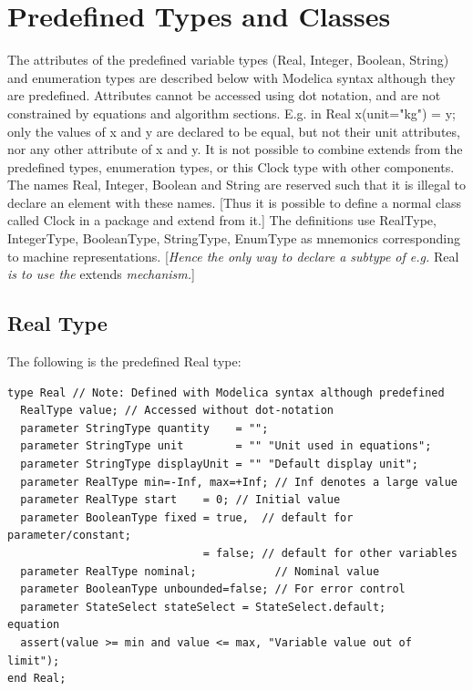 \documentclass[10pt,a4paper]{report}
\def\doublelabel#1{\label{#1}\hypertarget{#1}{}}
\begin{document}
\section{Predefined Types and Classes}\doublelabel{predefined-types-and-classes}

The attributes of the predefined variable types (Real, Integer, Boolean,
String) and enumeration types are described below with Modelica syntax
although they are predefined. Attributes cannot be accessed using dot
notation, and are not constrained by equations and algorithm sections.
E.g. in Real x(unit="kg") = y; only the values of x and y are declared
to be equal, but not their unit attributes, nor any other attribute of x
and y. It is not possible to combine extends from the predefined types,
enumeration types, or this Clock type with other components. The names
Real, Integer, Boolean and String are reserved such that it is illegal
to declare an element with these names. {[}Thus it is possible to define
a normal class called Clock in a package and extend from it.{]} The
definitions use RealType, IntegerType, BooleanType, StringType, EnumType
as mnemonics corresponding to machine representations. {[}\emph{Hence
the only way to declare a subtype of e.g.} Real \emph{is to use the}
extends \emph{mechanism.}{]}

\subsection{Real Type}\doublelabel{real-type}

The following is the predefined Real type:

\begin{lstlisting}[language=modelica]
type Real // Note: Defined with Modelica syntax although predefined
  RealType value; // Accessed without dot-notation
  parameter StringType quantity    = "";
  parameter StringType unit        = "" "Unit used in equations";
  parameter StringType displayUnit = "" "Default display unit";
  parameter RealType min=-Inf, max=+Inf; // Inf denotes a large value
  parameter RealType start    = 0; // Initial value
  parameter BooleanType fixed = true,  // default for parameter/constant;
                              = false; // default for other variables
  parameter RealType nominal;            // Nominal value
  parameter BooleanType unbounded=false; // For error control
  parameter StateSelect stateSelect = StateSelect.default;
equation
  assert(value >= min and value <= max, "Variable value out of limit");
end Real;
\end{lstlisting}
\end{document}
